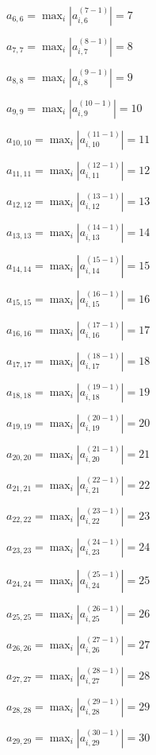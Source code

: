 \documentclass[a4paper,12pt]{article}
\begin{document}
$a _{ 6, 6 } =  \max _i |a _{ i, 6 } ^{ (7 - 1) } | = 7$

$a _{ 7, 7 } =  \max _i |a _{ i, 7 } ^{ (8 - 1) } | = 8$

$a _{ 8, 8 } =  \max _i |a _{ i, 8 } ^{ (9 - 1) } | = 9$

$a _{ 9, 9 } =  \max _i |a _{ i, 9 } ^{ (10 - 1) } | = 10$

$a _{ 10, 10 } =  \max _i |a _{ i, 10 } ^{ (11 - 1) } | = 11$

$a _{ 11, 11 } =  \max _i |a _{ i, 11 } ^{ (12 - 1) } | = 12$

$a _{ 12, 12 } =  \max _i |a _{ i, 12 } ^{ (13 - 1) } | = 13$

$a _{ 13, 13 } =  \max _i |a _{ i, 13 } ^{ (14 - 1) } | = 14$

$a _{ 14, 14 } =  \max _i |a _{ i, 14 } ^{ (15 - 1) } | = 15$

$a _{ 15, 15 } =  \max _i |a _{ i, 15 } ^{ (16 - 1) } | = 16$

$a _{ 16, 16 } =  \max _i |a _{ i, 16 } ^{ (17 - 1) } | = 17$

$a _{ 17, 17 } =  \max _i |a _{ i, 17 } ^{ (18 - 1) } | = 18$

$a _{ 18, 18 } =  \max _i |a _{ i, 18 } ^{ (19 - 1) } | = 19$

$a _{ 19, 19 } =  \max _i |a _{ i, 19 } ^{ (20 - 1) } | = 20$

$a _{ 20, 20 } =  \max _i |a _{ i, 20 } ^{ (21 - 1) } | = 21$

$a _{ 21, 21 } =  \max _i |a _{ i, 21 } ^{ (22 - 1) } | = 22$

$a _{ 22, 22 } =  \max _i |a _{ i, 22 } ^{ (23 - 1) } | = 23$

$a _{ 23, 23 } =  \max _i |a _{ i, 23 } ^{ (24 - 1) } | = 24$

$a _{ 24, 24 } =  \max _i |a _{ i, 24 } ^{ (25 - 1) } | = 25$

$a _{ 25, 25 } =  \max _i |a _{ i, 25 } ^{ (26 - 1) } | = 26$

$a _{ 26, 26 } =  \max _i |a _{ i, 26 } ^{ (27 - 1) } | = 27$

$a _{ 27, 27 } =  \max _i |a _{ i, 27 } ^{ (28 - 1) } | = 28$

$a _{ 28, 28 } =  \max _i |a _{ i, 28 } ^{ (29 - 1) } | = 29$

$a _{ 29, 29 } =  \max _i |a _{ i, 29 } ^{ (30 - 1) } | = 30$
\end{document}
